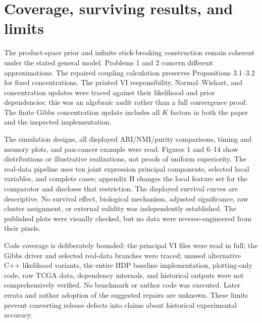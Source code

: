 \documentclass[10pt]{article}
\begin{document}
\section*{Coverage, surviving results, and limits}
The product-space prior and infinite stick-breaking construction remain coherent under the stated general model. Problems 1 and 2 concern different approximations. The repaired coupling calculation preserves Propositions 3.1–3.2 for fixed concentrations. The printed VI responsibility, Normal–Wishart, and concentration updates were traced against their likelihood and prior dependencies; this was an algebraic audit rather than a full convergence proof. The finite Gibbs concentration update includes all \(K\) factors in both the paper and the inspected implementation.\par
The simulation designs, all displayed ARI/NMI/purity comparisons, timing and memory plots, and pan-cancer example were read. Figures 1 and 6–14 show distributions or illustrative realizations, not proofs of uniform superiority. The real-data pipeline uses ten joint expression principal components, selected local variables, and complete cases; appendix H changes the local feature set for the comparator and discloses that restriction. The displayed survival curves are descriptive. No survival effect, biological mechanism, adjusted significance, raw cluster assignment, or external validity was independently established. The published plots were visually checked, but no data were reverse-engineered from their pixels.\par
Code coverage is deliberately bounded: the principal VI files were read in full; the Gibbs driver and selected real-data branches were traced; unused alternative C++ likelihood variants, the entire HDP baseline implementation, plotting-only code, raw TCGA data, dependency internals, and historical outputs were not comprehensively verified. No benchmark or author code was executed. Later errata and author adoption of the suggested repairs are unknown. These limits prevent converting release defects into claims about historical experimental accuracy.\par
\end{document}
